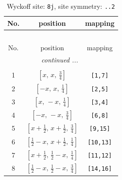 \documentclass[fleqn,8pt]{jsarticle}
\begin{document}
\begin{longtable}{ccc}
\caption{Wyckoff site: {\tt 8j}, site symmetry: {\tt ..2}}
 \\
 \hline \hline
No. & position & mapping \\ \hline \endfirsthead

\multicolumn{2}{l}{\tablename\ \thetable{}} \\
 \hline \hline
No. & position & mapping \\ \hline \endhead

 \hline \hline
\multicolumn{2}{r}{\footnotesize\it continued ...} \\ \endfoot

 \hline \hline
\multicolumn{2}{r}{} \\ \endlastfoot

1 & $\left[ x,\, x,\, \frac{3}{4} \right]$ & {\tt [1,7]} \\ \hline
2 & $\left[ - x,\, x,\, \frac{1}{4} \right]$ & {\tt [2,5]} \\ \hline
3 & $\left[ x,\, - x,\, \frac{1}{4} \right]$ & {\tt [3,4]} \\ \hline
4 & $\left[ - x,\, - x,\, \frac{3}{4} \right]$ & {\tt [6,8]} \\ \hline
5 & $\left[ x + \frac{1}{2},\, x + \frac{1}{2},\, \frac{3}{4} \right]$ & {\tt [9,15]} \\ \hline
6 & $\left[ \frac{1}{2} - x,\, x + \frac{1}{2},\, \frac{1}{4} \right]$ & {\tt [10,13]} \\ \hline
7 & $\left[ x + \frac{1}{2},\, \frac{1}{2} - x,\, \frac{1}{4} \right]$ & {\tt [11,12]} \\ \hline
8 & $\left[ \frac{1}{2} - x,\, \frac{1}{2} - x,\, \frac{3}{4} \right]$ & {\tt [14,16]} \\
\end{longtable}
\renewcommand{\arraystretch}{1.2}
\end{document}
